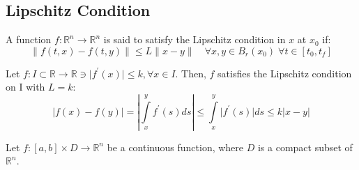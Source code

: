 \subsection{Lipschitz Condition}
A function \(f : \mathbb{R}^n \to \mathbb{R}^n\) is said to satisfy the Lipschitz condition in \(x\) at \(x_0\)
if:
\[
    \lVert f(t,x) - f(t,y) \rVert \leq L \lVert x - y \rVert \quad \forall
     x, y \in B_r(x_0) \; \forall t \in [t_0, t_f]
\]  
\begin{example}
    Let \(f: I \subset \mathbb{R} \to \mathbb{R} \ni \vert f^{\prime} (x) \vert \leq k, \forall x \in I\).
    Then, \(f\) satisfies the Lipschitz condition on I with \(L = k\):
    \[
        \lvert f(x) - f(y) \rvert = \left\lvert \int\limits_{x}^{y} f^{\prime} (s) ds \right\rvert \leq
        \int\limits_{x}^{y} \lvert f^{\prime} (s) \rvert ds \leq k \lvert x - y \rvert  
    \]
\end{example}
\begin{lemma}
    Let \(f : [a,b] \times D \to \mathbb{R}^n\) be a continuous function, where \(D\) is a
    compact subset of \(\mathbb{R}^n\).
\end{lemma}
